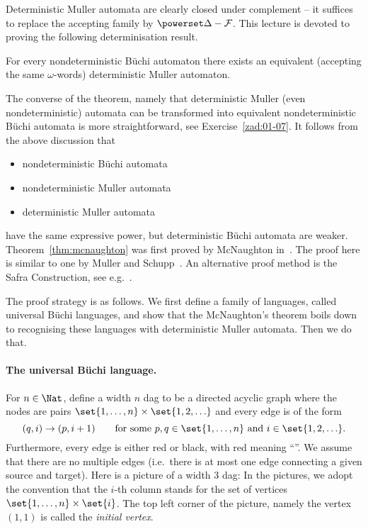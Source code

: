 Deterministic Muller automata are clearly closed under complement – it suffices to replace the accepting family by $\powerset \Delta -\mathcal F$. This lecture is devoted to proving the following determinisation result.

\begin{theorem}
 \label{thm:mcnaughton} For every nondeterministic Büchi automaton there exists an equivalent (accepting the same $\omega$-words) deterministic Muller automaton.	
\end{theorem}

The converse of the theorem, namely that deterministic Muller (even nondeterministic) automata can be transformed into equivalent nondeterministic Büchi automata is more straightforward, see Exercise~\ref{zad:01-07}. It  follows  from the above discussion that 
\begin{itemize}
	\item nondeterministic Büchi automata
	\item nondeterministic Muller automata
	\item deterministic Muller automata
\end{itemize}
have the same expressive power, but deterministic Büchi automata are weaker.
Theorem~\ref{thm:mcnaughton} was first proved by McNaughton in~\cite{McNaughton:1966}. The proof here is similar to one by  Muller and Schupp~\cite{Muller:1987dn}. An alternative proof method is the Safra Construction, see e.g.~\cite{Thomas:1997ec}.



The proof strategy is as follows. We first define a family of languages, called universal Büchi languages, and show that the McNaughton's theorem boils down to recognising these languages with deterministic Muller automata. Then we do that.



\paragraph*{The universal Büchi language.}
For $n \in \Nat$, define a width $n$ dag to be a directed acyclic graph where the nodes are pairs $\set{1,\ldots,n} \times \set{1,2,\ldots}$ and every edge is of the form $$(q,i) \to (p,i+1) \qquad \mbox{for some }p,q \in \set{1,\ldots,n}\mbox{ and }i \in \set{1,2,\ldots}.$$Furthermore, every edge is either red or black, with red meaning ``''. We assume that there are no multiple edges (i.e.~there is at most one edge connecting a given source and target). Here is a picture of a  width 3 dag:
In the pictures, we adopt the convention that the $i$-th column stands for the set of vertices $\set{1,\ldots,n} \times \set{i}$. The top left corner of the picture, namely the vertex $(1,1)$ is called the \emph{initial vertex}.



